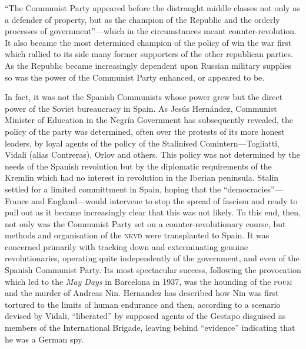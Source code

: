 ``The Communist Party appeared before the distraught middle classes not only as a defender of property, but as the champion of the Republic and the orderly processes of government''---which in the circumstances meant counter-revolution. It also became the most determined champion of the policy of win the war first which rallied to its side many former supporters of the other republican parties. As the Republic became increasingly dependent upon Russian military supplies so was the power of the Communist Party enhanced, or appeared to be.

In fact, it was not the Spanish Communists whose power grew but the direct power of the Soviet bureaucracy in Spain. As Jes\'us Hern\'andez, Communist Minister of Education in the Negr\'in Government has subsequently revealed, the policy of the party was determined, often over the protests of its more honest leaders, by loyal agents of the policy of the Stalinised Comintern---Togliatti, Vidali{\indexVVidali} (alias Contreras), Orlov and others. This policy was not determined by the needs of the Spanish revolution but by the diplomatic requirements of the Kremlin which had no interest in revolution in the Iberian peninsula. Stalin settled for a limited committment in Spain, hoping that the ``democracies''---France and England---would intervene to stop the spread of fascism and ready to pull out as it became increasingly clear that this was not likely. To this end, then, not only was the Communist Party set on a counter-revolutionary course, but methods and organisation of the \textsc{nkvd} were transplanted to Spain. It was concerned primarily with tracking down and exterminating genuine revolutionaries, operating quite independently of the government, and even of the Spanish Communist Party. Its most spectacular success, following the provocation which led to the \emph{May Days} in Barcelona in 1937, was the hounding of the \textsc{poum} and the murder of Andreas Nin.{\indexANin} Hernandez has described how Nin was first tortured to the limits of human endurance and then, according to a scenario devised by Vidali, ``liberated'' by supposed agents of the Gestapo disguised as members of the International Brigade, leaving behind ``evidence'' indicating that he was a German spy.

